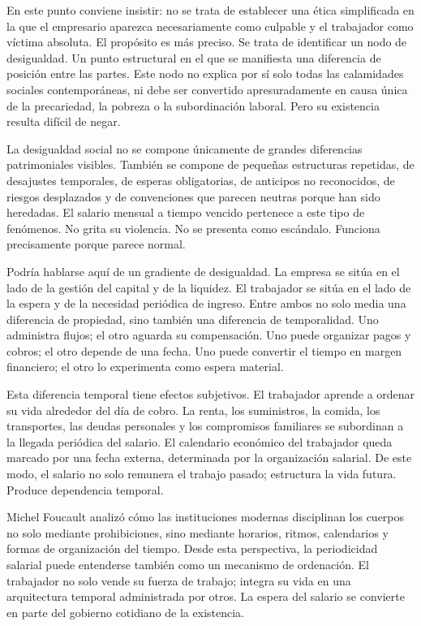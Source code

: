 \documentclass[12pt,a4paper]{article}
\begin{document}
En este punto conviene insistir: no se trata de establecer una ética simplificada en la que el empresario aparezca necesariamente como culpable y el trabajador como víctima absoluta. El propósito es más preciso. Se trata de identificar un nodo de desigualdad. Un punto estructural en el que se manifiesta una diferencia de posición entre las partes. Este nodo no explica por sí solo todas las calamidades sociales contemporáneas, ni debe ser convertido apresuradamente en causa única de la precariedad, la pobreza o la subordinación laboral. Pero su existencia resulta difícil de negar.

La desigualdad social no se compone únicamente de grandes diferencias patrimoniales visibles. También se compone de pequeñas estructuras repetidas, de desajustes temporales, de esperas obligatorias, de anticipos no reconocidos, de riesgos desplazados y de convenciones que parecen neutras porque han sido heredadas. El salario mensual a tiempo vencido pertenece a este tipo de fenómenos. No grita su violencia. No se presenta como escándalo. Funciona precisamente porque parece normal.

Podría hablarse aquí de un gradiente de desigualdad. La empresa se sitúa en el lado de la gestión del capital y de la liquidez. El trabajador se sitúa en el lado de la espera y de la necesidad periódica de ingreso. Entre ambos no solo media una diferencia de propiedad, sino también una diferencia de temporalidad. Uno administra flujos; el otro aguarda su compensación. Uno puede organizar pagos y cobros; el otro depende de una fecha. Uno puede convertir el tiempo en margen financiero; el otro lo experimenta como espera material.

Esta diferencia temporal tiene efectos subjetivos. El trabajador aprende a ordenar su vida alrededor del día de cobro. La renta, los suministros, la comida, los transportes, las deudas personales y los compromisos familiares se subordinan a la llegada periódica del salario. El calendario económico del trabajador queda marcado por una fecha externa, determinada por la organización salarial. De este modo, el salario no solo remunera el trabajo pasado; estructura la vida futura. Produce dependencia temporal.

Michel Foucault analizó cómo las instituciones modernas disciplinan los cuerpos no solo mediante prohibiciones, sino mediante horarios, ritmos, calendarios y formas de organización del tiempo. Desde esta perspectiva, la periodicidad salarial puede entenderse también como un mecanismo de ordenación. El trabajador no solo vende su fuerza de trabajo; integra su vida en una arquitectura temporal administrada por otros. La espera del salario se convierte en parte del gobierno cotidiano de la existencia.
\end{document}

